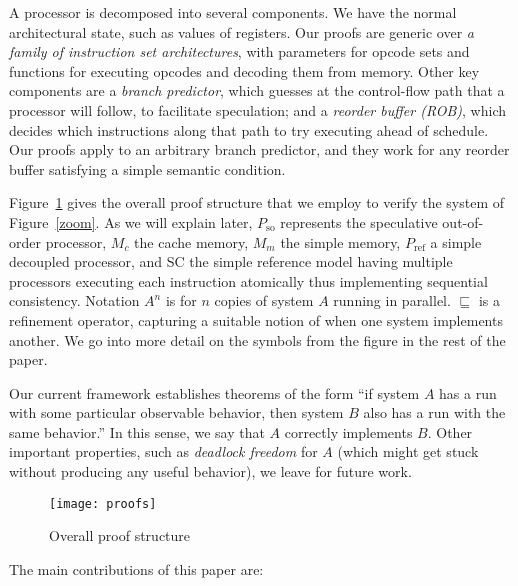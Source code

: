 A processor is decomposed into several components.  We have the normal
architectural state, such as values of registers.  Our proofs are generic over
\emph{a family of instruction set architectures}, with parameters for opcode sets and
functions for executing opcodes and decoding them from memory.  Other key
components are a \emph{branch predictor}, which guesses at the control-flow path
that a processor will follow, to facilitate speculation; and a
\emph{reorder buffer (ROB)}, which decides which instructions along that path to
try executing ahead of schedule.  Our proofs apply to an arbitrary branch predictor,
and they work for any reorder buffer satisfying a simple semantic condition.

Figure~\ref{proofs} gives the overall proof structure that we employ to verify
the system of Figure~\ref{zoom}. As we will explain later, $P_\text{so}$
represents the speculative out-of-order processor, $M_c$ the cache memory,
$M_m$ the simple memory, $P_\text{ref}$ a simple decoupled processor, and
SC the simple reference model having multiple processors executing each
instruction atomically thus implementing sequential consistency.  Notation
$A^n$ is for $n$ copies of system $A$ running in parallel.
$\sqsubseteq$ is a refinement operator, capturing a suitable notion of when
one system implements another.  We go into more detail on the symbols from
the figure in the rest of the paper.

Our current framework establishes theorems of the form ``if system $A$ has a run
with some particular observable behavior, then system $B$ also has a run with
the same behavior.''  In this sense, we say that $A$ correctly implements $B$.
Other important properties, such as \emph{deadlock freedom} for $A$ (which
might get stuck without producing any useful behavior), we leave for future
work.

\begin{figure}
\texttt{[image: proofs]}
\caption{Overall proof structure}
\label{proofs}
\end{figure}

The main contributions of this paper are:

